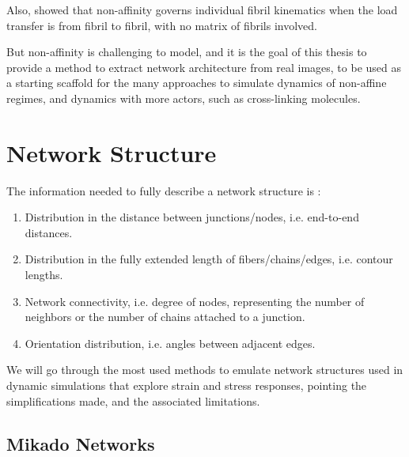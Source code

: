  Also, \citet{chandran_affine_2006}
showed that non-affinity governs individual fibril kinematics when the load
transfer is from fibril to fibril, with no matrix of fibrils involved.

But non-affinity is challenging to model, and it is the goal of this thesis to provide a method to extract network architecture from real images, to be used as a starting scaffold for the many approaches to simulate dynamics of non-affine regimes, and dynamics with more actors, such as cross-linking molecules.

\section{Network Structure}%
\label{sec:network_structure}

The information needed to fully describe a network structure is \cite{palmer_constitutive_2008}:
\begin{enumerate}[topsep=0pt]
  \item Distribution in the distance between junctions/nodes, i.e. end-to-end distances.
  \item Distribution in the fully extended length of fibers/chains/edges, i.e. contour lengths.
  \item Network connectivity, i.e. degree of nodes, representing the number of neighbors or the number of chains attached to a junction.
  \item Orientation distribution, i.e. angles between adjacent edges.
\end{enumerate}

We will go through the most used methods to emulate network structures used in dynamic simulations that explore strain and stress responses, pointing the simplifications made, and the associated limitations.

\subsection{Mikado Networks}%
\label{sub:mikado_networks}


